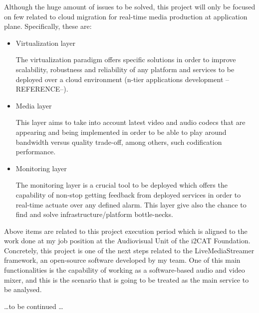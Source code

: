 Although the huge amount of issues to be solved, this project will only be focused on few related to cloud migration for real-time media production at application plane. Specifically, these are:

\begin{itemize}
\item Virtualization layer \hfill 

The virtualization paradigm offers specific solutions in order to improve scalability, robustness and reliability of any platform and services to be deployed over a cloud environment (n-tier applications development --REFERENCE--). 

\item Media layer \hfill 

This layer aims to take into account latest video and audio codecs that are appearing and being implemented in order to be able to play around bandwidth versus quality trade-off, among others, such codification performance. 

\item Monitoring layer \hfill 

The monitoring layer is a crucial tool to be deployed which offers the capability of non-stop getting feedback from deployed services in order to real-time actuate over any defined alarm. This layer give also the chance to find and solve infrastructure/platform bottle-necks.
\end{itemize}

Above items are related to this project execution period which is aligned to the work done at my job position at the Audiovisual Unit of the i2CAT Foundation. Concretely, this project is one of the next steps related to the LiveMediaStreamer framework, an open-source software developed by my team. One of this main functionalities is the capability of working as a software-based audio and video mixer, and this is the scenario that is going to be treated as the main service to be analysed.

\ldots to be continued \ldots







